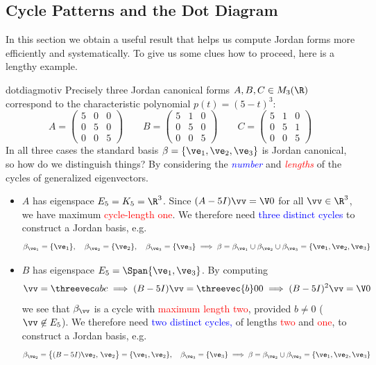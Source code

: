 \clearpage


\subsection{Cycle Patterns and the Dot Diagram}


In this section we obtain a useful result that helps us compute Jordan forms more efficiently and systematically. To give us some clues how to proceed, here is a lengthy example.

\begin{example}{}{dotdiagmotiv}
Precisely three Jordan canonical forms $A,B,C\in M_3(\R)$ correspond to the characteristic polynomial $p(t)=(5-t)^3$:
\[A=\begin{pmatrix}
5&0&0\\
0&5&0\\
0&0&5
\end{pmatrix}
\qquad
B=\begin{pmatrix}
5&1&0\\
0&5&0\\
0&0&5
\end{pmatrix}
\qquad
C=\begin{pmatrix}
5&1&0\\
0&5&1\\
0&0&5
\end{pmatrix}\]
In all three cases the standard basis $\beta=\{\ve_1,\ve_2,\ve_3\}$ is Jordan canonical, so how do we distinguish things? By considering the \emph{\textcolor{blue}{number}} and \emph{\textcolor{red}{lengths}} of the cycles of generalized eigenvectors.
\begin{itemize}
  \item $A$ has eigenspace $E_5=K_5=\R^3$. Since $(A-5I)\vv=\V0$ for all $\vv\in\R^3$, we have maximum \textcolor{red}{cycle-length one}. We therefore need \textcolor{blue}{three distinct cycles} to construct a Jordan basis, e.g.
  \[\beta_{\ve_1}=\{\ve_1\},\quad \beta_{\ve_2}=\{\ve_2\},\quad \beta_{\ve_3}=\{\ve_3\} \implies \beta=\beta_{\ve_1}\cup\beta_{\ve_2}\cup\beta_{\ve_3}=\{\ve_1,\ve_2,\ve_3\}\]
  
  \item $B$ has eigenspace $E_5=\Span\{\ve_1,\ve_3\}$. By computing
  \[\vv=\threevec abc\implies (B-5I)\vv=\threevec{b}00 \implies (B-5I)^2\vv=\V0\]
  we see that $\beta_\vv$ is a cycle with \textcolor{red}{maximum length two}, provided $b\neq 0$ ($\vv\not\in E_5$). We therefore need \textcolor{blue}{two distinct cycles,} of lengths \textcolor{red}{two} and \textcolor{red}{one}, to construct a Jordan basis, e.g.
  \[\beta_{\ve_2}=\bigl\{(B-5I)\ve_2,\,\ve_2\bigr\}=\{\ve_1,\ve_2\},\quad \beta_{\ve_3}=\{\ve_3\}\implies \beta=\beta_{\ve_2}\cup\beta_{\ve_3}=\{\ve_1,\ve_2,\ve_3\}\]
  

\end{itemize}
\end{example}
